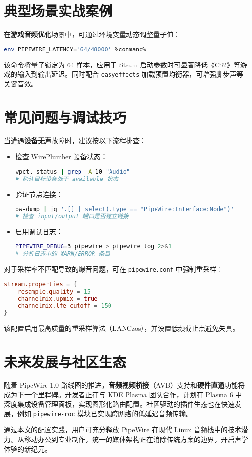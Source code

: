 \chapter{典型场景实战案例}
在\textbf{游戏音频优化}场景中，可通过环境变量动态调整量子值：\par
\begin{lstlisting}[language=bash]
env PIPEWIRE_LATENCY="64/48000" %command%
\end{lstlisting}
该命令将量子锁定为 64 样本，应用于 Steam 启动参数时可显著降低《CS2》等游戏的输入到输出延迟。同时配合 \verb!easyeffects! 加载预置均衡器，可增强脚步声等关键音效。\par
\chapter{常见问题与调试技巧}
当遭遇\textbf{设备无声}故障时，建议按以下流程排查：\par
\begin{itemize}
\item 检查 WirePlumber 设备状态：\begin{lstlisting}[language=bash]
wpctl status | grep -A 10 "Audio"
# 确认目标设备处于 available 状态
\end{lstlisting}

\item 验证节点连接：\begin{lstlisting}[language=bash]
pw-dump | jq '.[] | select(.type == "PipeWire:Interface:Node")'
# 检查 input/output 端口是否建立链接
\end{lstlisting}

\item 启用调试日志：\begin{lstlisting}[language=bash]
PIPEWIRE_DEBUG=3 pipewire > pipewire.log 2>&1
# 分析日志中的 WARN/ERROR 条目
\end{lstlisting}

\end{itemize}
对于采样率不匹配导致的爆音问题，可在 \verb!pipewire.conf! 中强制重采样：\par
\begin{lstlisting}[language=conf]
stream.properties = {
    resample.quality = 15
    channelmix.upmix = true
    channelmix.lfe-cutoff = 150
}
\end{lstlisting}
该配置启用最高质量的重采样算法（LANCzos），并设置低频截止点避免失真。\par
\chapter{未来发展与社区生态}
随着 PipeWire 1.0 路线图的推进，\textbf{音频视频桥接}（AVB）支持和\textbf{硬件直通}功能将成为下一个里程碑。开发者正在与 KDE Plasma 团队合作，计划在 Plasma 6 中深度集成设备管理面板，实现图形化路由配置。社区驱动的插件生态也在快速发展，例如 \verb!pipewire-roc! 模块已实现跨网络的低延迟音频传输。\par
通过本文的配置实践，用户可充分释放 PipeWire 在现代 Linux 音频栈中的技术潜力。从移动办公到专业制作，统一的媒体架构正在消除传统方案的边界，开启声学体验的新纪元。\par
